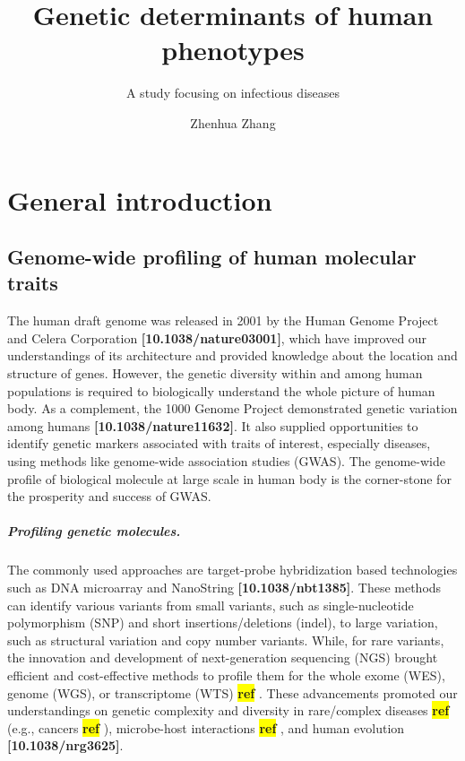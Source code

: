 \documentclass[12pt,usletter,fancy]{elegantbook}
\title{Genetic determinants of human phenotypes}
\subtitle{A study focusing on infectious diseases}
\author{Zhenhua Zhang}
\institute{University Medical Center Groningen}
\def\blankpage{%
  \clearpage%
  \thispagestyle{empty}%
  \addtocounter{page}{-1}%
  \null%
\clearpage}
\newcommand{\reqref}[1][ref]{
  \colorbox{yellow}{\textbf{#1}}
}
\begin{document}
\maketitle
\frontmatter

\mainmatter


\chapter{General introduction}

\newpage
\section*{Genome-wide profiling of human molecular traits}
The human draft genome was released in 2001 by the Human Genome Project and Celera Corporation \textbf{[10.1038/nature03001]}, which have improved our understandings of its architecture and provided knowledge about the location and structure of genes.
However, the genetic diversity within and among human populations is required to biologically understand the whole picture of human body.
As a complement, the 1000 Genome Project demonstrated genetic variation among humans \textbf{[10.1038/nature11632]}.
It also supplied opportunities to identify genetic markers associated with traits of interest, especially diseases, using methods like genome-wide association studies (GWAS).
The genome-wide profile of biological molecule at large scale in human body is the corner-stone for the prosperity and success of GWAS.

\paragraph*{Profiling genetic molecules.}
The commonly used approaches are target-probe hybridization based technologies such as DNA microarray and NanoString \textbf{[10.1038/nbt1385]}.
These methods can identify various variants from small variants, such as single-nucleotide polymorphism (SNP) and short insertions/deletions (indel), to large variation, such as structural variation and copy number variants.
While, for rare variants, the innovation and development of next-generation sequencing (NGS) brought efficient and cost-effective methods to profile them for the whole exome (WES), genome (WGS), or transcriptome (WTS)\reqref.
These advancements promoted our understandings on genetic complexity and diversity in rare/complex diseases \reqref (e.g., cancers \reqref), microbe-host interactions \reqref, and human evolution \textbf{[10.1038/nrg3625]}.
\end{document}
